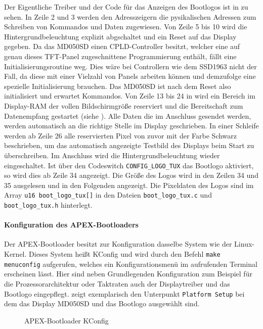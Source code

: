 Der Eigentliche Treiber und der Code für das Anzeigen des Bootlogos ist in  zu sehen. In Zeile 2 und 3 werden den Adresszeigern die pysikalischen Adressen zum Schreiben von Kommandos und Daten zugewiesen. Von Zeile 5 bis 10 wird die Hintergrundbeleuchtung explizit abgschaltet und ein Reset auf das Display gegeben. Da das MD050SD einen CPLD-Controller besitzt, welcher eine auf genau dieses TFT-Panel zugeschnittene Programmierung enthält, fällt eine Initialisierungsroutine weg. Dies wäre bei Controllern wie dem SSD1963 nicht der Fall, da diese mit einer Vielzahl von Panels arbeiten können und demzufolge eine spezielle Initialisierung brauchen. Das MD050SD ist nach dem Reset also initialisiert und erwartet Kommandos. Von Zeile 13 bis 24 in  wird ein Bereich im Display-RAM der vollen Bildschirmgröße reserviert und die Bereitschaft zum Datenempfang gestartet (siehe ). Alle Daten die im Anschluss gesendet werden, werden automatisch an die richtige Stelle im Display geschrieben. In einer Schleife werden ab Zeile 26 alle reservierten Pixel von zuvor mit der Farbe Schwarz beschrieben, um das automatisch angezeigte Testbild des Displays beim Start zu überschreiben. Im Anschluss wird die Hintergrundbeleuchtung wieder eingeschaltet. Ist über den Codeswitch \lstinline|CONFIG_LOGO_TUX| das Bootlogo aktiviert, so wird dies ab Zeile 34 angezeigt. Die Größe des Logos wird in den Zeilen 34 und 35 ausgelesen und in den Folgenden angezeigt. Die Pixeldaten des Logos sind im Array \lstinline|u16 boot_logo_tux[]| in den Dateien \lstinline|boot_logo_tux.c| und \lstinline|boot_logo_tux.h| hinterlegt.


\paragraph{Konfiguration des APEX-Bootloaders}
\label{cha:config_apex}
Der APEX-Bootloader besitzt zur Konfiguration dasselbe System wie der Linux-Kernel. Dieses System heißt KConfig und wird durch den Befehl \lstinline|make menuconfig| aufgerufen, welches ein Konfigurationsmenü im aufrufenden Terminal erscheinen lässt. Hier sind neben Grundlegenden Konfiguration zum Beispiel für die Prozessorarchitektur oder Taktraten auch der Displaytreiber und das Bootlogo eingepflegt.  zeigt exemplarisch den Unterpunkt \lstinline|Platform Setup| bei dem das Display MD050SD und das Bootlogo ausgewählt sind. 

\begin{figure}[tbph]
	\centering
{}
	\caption{APEX-Bootloader KConfig}
	\label{fig:apex_config}
\end{figure}
\newpage

